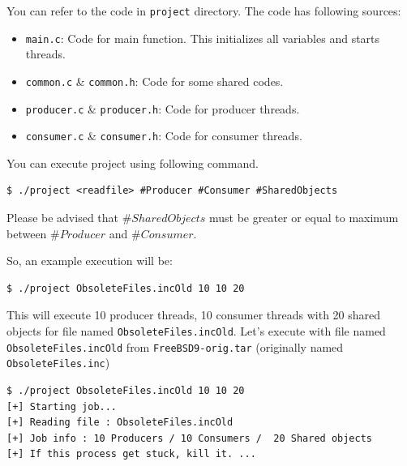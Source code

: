 \documentclass{homework}
\begin{document}
You can refer to the code in \texttt{project} directory. The code has following sources:
\begin{itemize}
    \item \texttt{main.c}: Code for main function. This initializes all variables and starts threads.
    \item \texttt{common.c} \& \texttt{common.h}: Code for some shared codes.
    \item \texttt{producer.c} \& \texttt{producer.h}: Code for producer threads.
    \item \texttt{consumer.c} \& \texttt{consumer.h}: Code for consumer threads.
\end{itemize}
You can execute project using following command.
\\
\begin{center}
\begin{code}
\begin{verbatim}
$ ./project <readfile> #Producer #Consumer #SharedObjects
\end{verbatim}
\end{code}
\end{center}
Please be advised that $\#SharedObjects$ must be greater or equal to maximum between $\#Producer$ and $\#Consumer$.
\par
So, an example execution will be:
\\
\begin{center}
\begin{code}
\begin{verbatim}
$ ./project ObsoleteFiles.incOld 10 10 20
\end{verbatim}
\end{code}
\end{center}
This will execute 10 producer threads, 10 consumer threads with 20 shared objects for file named \texttt{ObsoleteFiles.incOld}. Let’s execute with file named \texttt{ObsoleteFiles.incOld} from \texttt{FreeBSD9-orig.tar} (originally named \texttt{ObsoleteFiles.inc})
\\

\begin{center}
\begin{code}
\begin{verbatim}
$ ./project ObsoleteFiles.incOld 10 10 20
[+] Starting job...
[+] Reading file : ObsoleteFiles.incOld
[+] Job info : 10 Producers / 10 Consumers /  20 Shared objects
[+] If this process get stuck, kill it. ...
\end{verbatim}
\end{code}
\end{center}
\end{document}
